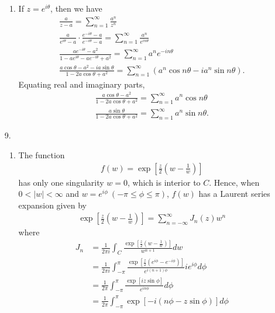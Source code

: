 \documentclass[a4paper,12pt]{article}
\begin{document}
\begin{enumerate}
\begin{enumerate}
            \item
                If $z = e^{i\theta}$, then we have
                \begin{gather*}
                    \frac{a}{z - a} = \sum_{n = 1}^\infty \frac{a^n}{z^n} \\
                    \frac{a}{e^{i\theta} - a} \cdot \frac{e^{-i\theta} - a}{e^{-i\theta} - a} = \sum_{n = 1}^\infty \frac{a^n}{e^{in\theta}} \\
                    \frac{ae^{-i\theta} - a^2}{1 - ae^{i\theta} - ae^{-i\theta} + a^2} = \sum_{n = 1}^\infty a^n e^{-in\theta} \\
                    \frac{a\cos\theta - a^2 - ia\sin\theta}{1 - 2a\cos\theta + a^2} = \sum_{n = 1}^\infty (a^n \cos{n\theta} - ia^n\sin{n\theta}).
                \end{gather*}
                Equating real and imaginary parts,
                \begin{gather*}
                    \frac{a\cos\theta - a^2}{1 - 2a\cos\theta + a^2} = \sum_{n = 1}^\infty a^n \cos{n\theta} \\
                    \frac{a\sin\theta}{1 - 2a\cos\theta + a^2} = \sum_{n = 1}^\infty a^n\sin{n\theta}.
                \end{gather*}
        \end{enumerate}

    \item[9.]
        \begin{enumerate}
            \item
                The function
                \begin{align*}
                    f(w) = \exp \left[ \frac{z}{2} \left( w - \frac{1}{w} \right) \right]
                \end{align*}
                has only one singularity $w = 0$, which is interior to $C$. Hence, when $0 < |w| < \infty$ and $w = e^{i\phi}\ (-\pi \leq \phi \leq \pi)$, $f(w)$ has a Laurent series expansion given by
                \begin{align*}
                    \exp \left[ \frac{z}{2} \left( w - \frac{1}{w} \right) \right] = \sum_{n = -\infty}^\infty J_n(z) w^n
                \end{align*}
                where
                \begin{align*}
                    J_n &= \frac{1}{2\pi i} \int_C \frac{\exp \left[ \frac{z}{2} \left( w - \frac{1}{w} \right) \right]}{w^{n + 1}} dw \\
                    &= \frac{1}{2\pi i} \int_{-\pi}^\pi \frac{\exp \left[ \frac{z}{2} \left( e^{i\phi} - e^{-i\phi} \right) \right]}{e^{i(n + 1)\phi}} ie^{i\phi} d\phi \\
                    &= \frac{1}{2\pi} \int_{-\pi}^\pi \frac{\exp \left[ iz \sin\phi \right]}{e^{in\phi}} d\phi \\
                    &= \frac{1}{2\pi} \int_{-\pi}^\pi \exp[-i(n\phi - z\sin\phi)] d\phi
                \end{align*}
                

\end{enumerate}
\end{enumerate}
\end{document}
